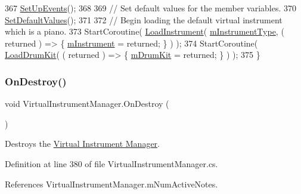 \begin{DoxyCode}
367         \hyperlink{group___v_i_m_priv_func_gaa207d18111d38374017c580de4077589}{SetUpEvents}();
368 
369         \textcolor{comment}{// Set default values for the member variables.}
370         \hyperlink{group___v_i_m_priv_func_gaa9e05e51f025afb0ab5cb2a8532c8bba}{SetDefaultValues}();
371 
372         \textcolor{comment}{// Begin loading the default virtual instrument which is a piano.}
373         StartCoroutine( \hyperlink{group___v_i_m_coroutines_gab8082c1cc590771bf57da8b5ae8603d1}{LoadInstrument}( \hyperlink{group___v_i_m_priv_ga108c350257b3a2080e06cd4a8251f6a4}{mInstrumentType}, ( returned ) => \{ 
      \hyperlink{group___v_i_m_priv_gaed435d1f9be09864846db4322dc21fd1}{mInstrument} = returned; \} ) );
374         StartCoroutine( \hyperlink{group___v_i_m_coroutines_gaba165ca4757b6c8555914fe6b42b638d}{LoadDrumKit}( ( returned ) => \{ \hyperlink{group___v_i_m_priv_ga0bc7c9f776b0d2dae0ccb1f1ee5f2143}{mDrumKit} = returned; \} ) );
375     \}
\end{DoxyCode}
\mbox{\label{group___v_i_m_unity_ga87f2b8783dc03eac75819c3ace35f880}} 
\subsubsection{\texorpdfstring{On\+Destroy()}{OnDestroy()}}
{\footnotesize\ttfamily void Virtual\+Instrument\+Manager.\+On\+Destroy (\begin{DoxyParamCaption}{ }\end{DoxyParamCaption})\hspace{0.3cm}{\ttfamily [private]}}



Destroys the \hyperlink{group___v_i_m}{Virtual Instrument Manager}. 



Definition at line 380 of file Virtual\+Instrument\+Manager.\+cs.



References Virtual\+Instrument\+Manager.\+m\+Num\+Active\+Notes.


